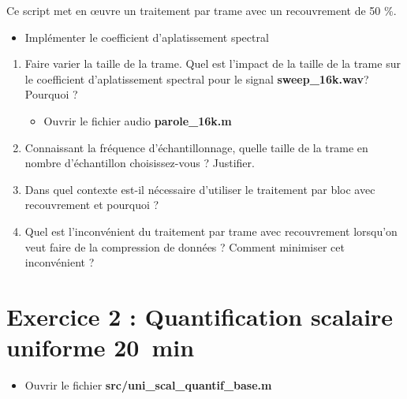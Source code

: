 \documentclass{article}
\begin{document}
Ce script met en \oe uvre un traitement par trame avec un recouvrement de 50 \%.
\begin{itemize}
	\item Implémenter le coefficient d'aplatissement spectral
\end{itemize}

\begin{enumerate}[label=\textbf{\arabic*})]
	\item Faire varier la taille de la trame. Quel est l'impact de la taille de la trame sur le coefficient d'aplatissement spectral pour le signal \textbf{sweep\_16k.wav}? Pourquoi ?
	\begin{itemize}
		\item Ouvrir le fichier audio \textbf{parole\_16k.m}
	\end{itemize}
	\item Connaissant la fréquence d’échantillonnage, quelle taille de la trame en nombre d’échantillon choisissez-vous ? Justifier.
	\item Dans quel contexte est-il nécessaire d'utiliser le traitement par bloc avec recouvrement et pourquoi ?
	\item Quel est l’inconvénient du traitement par trame avec recouvrement lorsqu’on veut faire de la compression de données ? Comment minimiser cet inconvénient ?
\end{enumerate}

\section{Exercice 2 : Quantification scalaire uniforme \small{20~min}}

\begin{itemize}
	\item Ouvrir le fichier \textbf{src/uni\_scal\_quantif\_base.m}
\end{itemize}
\end{document}
